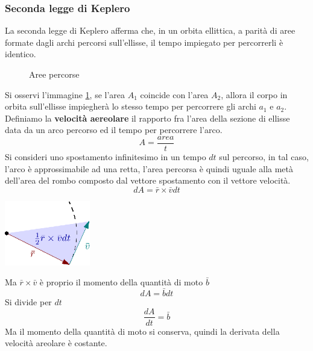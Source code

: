 \documentclass[10pt, letterpaper]{report}
\begin{document}
\subsubsection{Seconda legge di Keplero}
La seconda legge di Keplero afferma che, in un orbita ellittica, a parità di 
aree formate dagli archi percorsi sull'ellisse, il tempo impiegato per percorrerli 
è identico.\acc \begin{figure}[h]
    \caption{Aree percorse}
    \label{fig:areePer}
\end{figure}
Si osservi l'immagine \ref{fig:areePer}, se l'area $A_1$ coincide 
con l'area $A_2$, allora il corpo in orbita sull'ellisse impiegherà lo 
stesso tempo per percorrere gli archi $a_1$ e $a_2$.
\acc 
Definiamo la \textbf{velocità aereolare} il rapporto fra 
l'area della sezione di ellisse data da un arco 
percorso ed il tempo per percorrere l'arco.
$$ A=\frac{area}{t}$$
Si consideri uno spostamento infinitesimo in un tempo 
$dt$ sul percorso, 
in tal caso, l'arco è approssimabile ad una retta, l'area 
percorsa è quindi uguale alla metà dell'area del rombo composto dal vettore 
spostamento con il vettore velocità.
$$ dA=\bar r \times \bar v dt$$
\begin{center}
    \includegraphics[width=0.28\textwidth ]{images/spostInfinitesimo.eps}
\end{center}
Ma $\bar r\times \bar v$ è proprio il momento della quantità di moto $\bar b$
$$ dA=\bar b dt$$
Si divide per $dt$ 
$$ \dfrac{dA}{dt}=\bar b $$
Ma il momento della quantità di moto si conserva, quindi 
la derivata della velocità areolare è costante.
\flowerLine 
\end{document}
